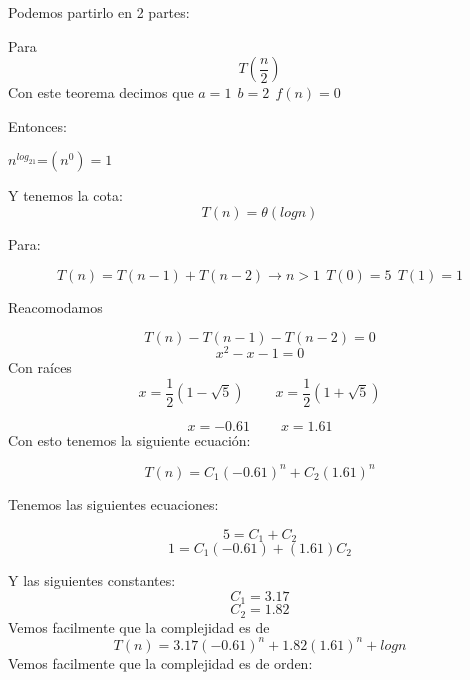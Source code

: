 \documentclass[12pt, fleqn]{article}                             %
\theoremstyle{break}                                            %
\begin{document}
    Podemos partirlo en 2 partes:

    Para
    \begin{equation*}
        T(\dfrac{n}{2})
    \end{equation*}
     Con este teorema decimos que $a=1\:\:b=2\:\:f(n)=0$

    Entonces:


    $n^{log_21}$=$(n^0)=1$

    Y tenemos la cota:
    \begin{equation*}
        T(n)=\theta(logn)
    \end{equation*}

    Para:

    \begin{equation*}
        T(n)=T(n-1)+T(n-2) \rightarrow n>1 \:\: T(0)=5 \:\: T(1)=1
    \end{equation*}

     Reacomodamos

    \begin{equation*}
        T(n)-T(n-1)-T(n-2)=0
    \end{equation*}
        \begin{equation*}
        x^2-x-1=0
    \end{equation*}
    Con raíces
    \begin{equation*}
        x=\dfrac{1}{2}(1-\sqrt{5})\:\:\:\:\:\:\:\:\:\: x=\dfrac{1}{2}(1+\sqrt{5})
    \end{equation*}

    \begin{equation*}
        x=-0.61\:\:\:\:\:\:\:\:\:\: x=1.61
    \end{equation*}
    Con esto tenemos la siguiente ecuación:

    \begin{equation*}
        T(n)=C_1(-0.61)^n+C_2(1.61)^n
    \end{equation*}

    Tenemos las siguientes ecuaciones:

    \begin{equation*}
        5=C_1+C_2
    \end{equation*}
    \begin{equation*}
        1=C_1(-0.61)+(1.61)C_2
    \end{equation*}

    Y las siguientes constantes:
    \begin{equation*}
        C_1=3.17
    \end{equation*} 
    \begin{equation*}
        C_2=1.82
    \end{equation*}
    Vemos facilmente que la complejidad es de  
    \begin{equation*}
        T(n)=3.17(-0.61)^n+1.82(1.61)^n+logn
    \end{equation*}
    Vemos facilmente que la complejidad es de orden:
\end{document}
